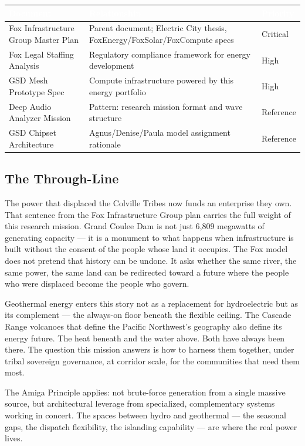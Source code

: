 \documentclass[11pt,letterpaper]{article}
\newcommand{\tableheader}[1]{\textbf{\sffamily\textcolor{white}{#1}}}
\begin{document}
\begin{center}
\begin{tabularx}{\textwidth}{L{4cm}XC{2cm}}
\toprule
{}
\tableheader{Document} & \tableheader{Relationship} & \tableheader{Priority} \\
\midrule
Fox Infrastructure Group Master Plan & Parent document; Electric City thesis, FoxEnergy/FoxSolar/FoxCompute specs & Critical \\
Fox Legal Staffing Analysis & Regulatory compliance framework for energy development & High \\
GSD Mesh Prototype Spec & Compute infrastructure powered by this energy portfolio & High \\
Deep Audio Analyzer Mission & Pattern: research mission format and wave structure & Reference \\
GSD Chipset Architecture & Agnus/Denise/Paula model assignment rationale & Reference \\
\bottomrule
\end{tabularx}
\end{center}

\subsection{The Through-Line}

The power that displaced the Colville Tribes now funds an enterprise they own. That sentence from the Fox Infrastructure Group plan carries the full weight of this research mission. Grand Coulee Dam is not just 6,809 megawatts of generating capacity --- it is a monument to what happens when infrastructure is built without the consent of the people whose land it occupies. The Fox model does not pretend that history can be undone. It asks whether the same river, the same power, the same land can be redirected toward a future where the people who were displaced become the people who govern.

Geothermal energy enters this story not as a replacement for hydroelectric but as its complement --- the always-on floor beneath the flexible ceiling. The Cascade Range volcanoes that define the Pacific Northwest's geography also define its energy future. The heat beneath and the water above. Both have always been there. The question this mission answers is how to harness them together, under tribal sovereign governance, at corridor scale, for the communities that need them most.

The Amiga Principle applies: not brute-force generation from a single massive source, but architectural leverage from specialized, complementary systems working in concert. The spaces between hydro and geothermal --- the seasonal gaps, the dispatch flexibility, the islanding capability --- are where the real power lives.
\end{document}
